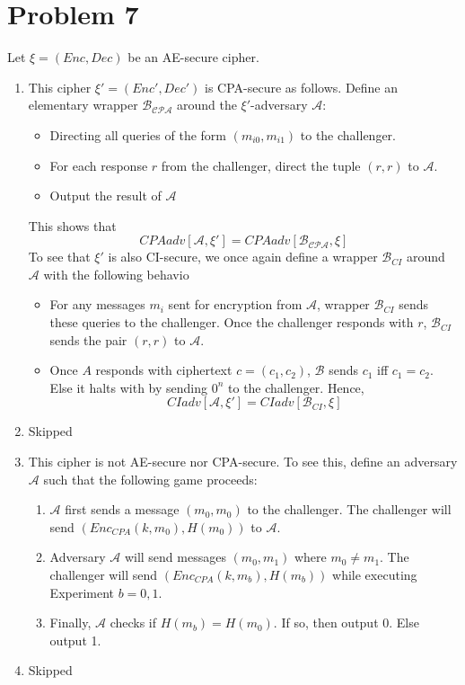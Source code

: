 \documentclass[11pt]{article}
\begin{document}
\section*{Problem 7}
Let $\xi = (Enc, Dec)$ be an AE-secure cipher.
\begin{enumerate}
  \item This cipher $\xi' = (Enc', Dec')$ is CPA-secure as follows. Define an elementary wrapper $\mathcal{B_{CPA}}$ around the $\xi'$-adversary $\mathcal{A}$:
  \begin{itemize}
    \item Directing all queries of the form $(m_{i0}, m_{i1})$ to the challenger.
    \item For each response $r$ from the challenger, direct the tuple $(r,r)$ to $\mathcal{A}$.
    \item Output the result of $\mathcal{A}$
  \end{itemize}

   This shows that
    \[CPAadv[\mathcal{A}, \xi'] = CPAadv[\mathcal{B_{CPA}}, \xi]\]
  To see that $\xi'$ is also CI-secure, we once again define a wrapper $\mathcal{B}_{CI}$ around $\mathcal{A}$ with the following behavio
  \begin{itemize}
    \item For any messages $m_i$ sent for encryption from $\mathcal{A}$, wrapper $\mathcal{B}_{CI}$ sends these queries to the challenger. Once the challenger responds with $r$, $\mathcal{B}_{CI}$ sends the pair $(r,r)$ to $\mathcal{A}$.
    \item Once $A$ responds with ciphertext $c = (c_1, c_2)$, $\mathcal{B}$ sends $c_1$ iff $c_1 = c_2$. Else it halts with by sending $0^n$ to the challenger.
    Hence,
        \[CIadv[\mathcal{A}, \xi'] = CIadv[\mathcal{B}_{CI}, \xi]\]

  \end{itemize}

  \item Skipped
  \item This cipher is not AE-secure nor CPA-secure. To see this, define an adversary $\mathcal{A}$ such that the following game proceeds:
  \begin{enumerate}
    \item $\mathcal{A}$ first sends a message $(m_0, m_0)$ to the challenger. The challenger will send $(Enc_{CPA}(k,m_0), H(m_0))$ to $\mathcal{A}$.
    \item Adversary $\mathcal{A}$ will send messages $(m_0, m_1)$ where $m_0 \neq m_1$. The challenger will send  $(Enc_{CPA}(k,m_b), H(m_b))$ while executing Experiment $b=0,1$.
    \item Finally, $\mathcal{A}$ checks if $H(m_b) = H(m_0)$. If so, then output 0. Else output 1.
  \end{enumerate}
  \item Skipped
\end{enumerate}
\end{document}
